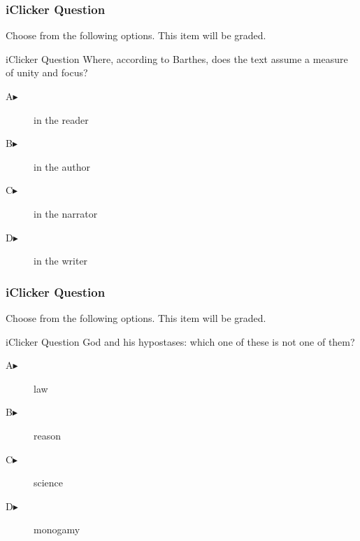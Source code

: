 \documentclass[xcolor=dvipsnames]{beamer}
\begin{document}
\begin{frame}
  \frametitle{iClicker Question}
Choose from the following options. This item will be graded.
\begin{block}{iClicker Question}
Where, according to Barthes, does the text assume a measure of unity
and focus?
\end{block}
\begin{description}
\item[A\hspace{.2in}$\blacktriangleright$] in the reader
\item[B\hspace{.2in}$\blacktriangleright$] in the author
\item[C\hspace{.2in}$\blacktriangleright$] in the narrator
\item[D\hspace{.2in}$\blacktriangleright$] in the writer
\end{description}
\end{frame}

\begin{frame}
  \frametitle{iClicker Question}
Choose from the following options. This item will be graded.
\begin{block}{iClicker Question}
God and his hypostases: which one of these is not one of them?
\end{block}
\begin{description}
\item[A\hspace{.2in}$\blacktriangleright$] law
\item[B\hspace{.2in}$\blacktriangleright$] reason
\item[C\hspace{.2in}$\blacktriangleright$] science
\item[D\hspace{.2in}$\blacktriangleright$] monogamy
\end{description}
\end{frame}
\end{document}
